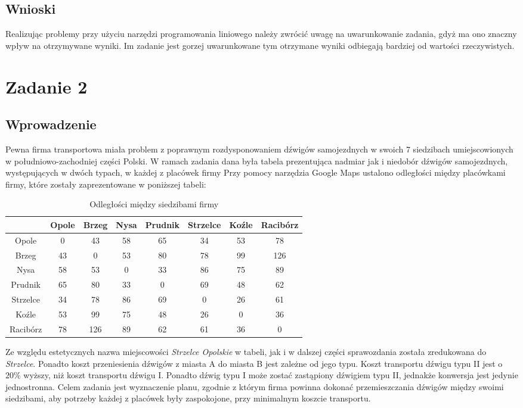 \documentclass[a4paper,14pt]{report}
\begin{document}
\section{Wnioski}
    Realizując problemy przy użyciu narzędzi programowania liniowego należy zwrócić uwagę na uwarunkowanie zadania, gdyż
    ma ono znaczny wpływ na otrzymywane wyniki. Im zadanie jest gorzej uwarunkowane tym otrzymane wyniki odbiegają bardziej 
    od wartości rzeczywistych.

\chapter{Zadanie 2}
\section{Wprowadzenie}
    Pewna firma transportowa miała problem z poprawnym rozdysponowaniem 
    dźwigów samojezdnych w swoich 7 siedzibach umiejscowionych w 
    południowo-zachodniej części Polski. W ramach zadania dana była 
    tabela prezentująca nadmiar jak i niedobór dźwigów samojezdnych,
    występujących w dwóch typach, w każdej z placówek firmy
    Przy pomocy narzędzia Google Maps ustalono odległości między placówkami firmy,
    które zostały zaprezentowane w poniższej tabeli:
    \begin{table}[H]
        \centering
        \begin{tabular}{|c | c | c | c | c | c | c | c |} 
        \hline
         & Opole & Brzeg & Nysa & Prudnik & Strzelce & Koźle & Racibórz \\
        \hline
        Opole & 0 & 43 & 58 & 65 & 34 & 53 & 78 \\
        Brzeg & 43 & 0 & 53 & 80 & 78 & 99 & 126 \\
        Nysa & 58 & 53 & 0 & 33 & 86 & 75 & 89 \\
        Prudnik & 65 & 80 & 33 & 0 & 69 & 48 & 62 \\
        Strzelce & 34 & 78 & 86 & 69 & 0 & 26 & 61 \\
        Koźle & 53 & 99 & 75 & 48 & 26 & 0 & 36 \\
        Racibórz & 78 & 126 & 89 & 62 & 61 & 36 & 0 \\
        \hline
        \end{tabular}
        \caption{Odległości między siedzibami firmy}
    \end{table}
    Ze względu estetycznych nazwa miejscowości \textit{Strzelce Opolskie} w tabeli, jak i w dalszej 
    części sprawozdania została zredukowana do \textit{Strzelce}.
    Ponadto koszt przeniesienia dźwigów z miasta A do miasta B jest zależne od 
    jego typu. Koszt transportu dźwigu typu II jest o $20\%$ wyższy, niż koszt 
    transportu dźwigu I. Ponadto dźwig typu I może zostać zastąpiony dźwigiem typu II,
    jednakże konwersja jest jedynie jednostronna.
    Celem zadania jest wyznaczenie planu, zgodnie z którym firma powinna dokonać 
    przemieszczania dźwigów między swoimi siedzibami, aby potrzeby każdej z placówek 
    były zaspokojone, przy minimalnym koszcie transportu.
\end{document}
